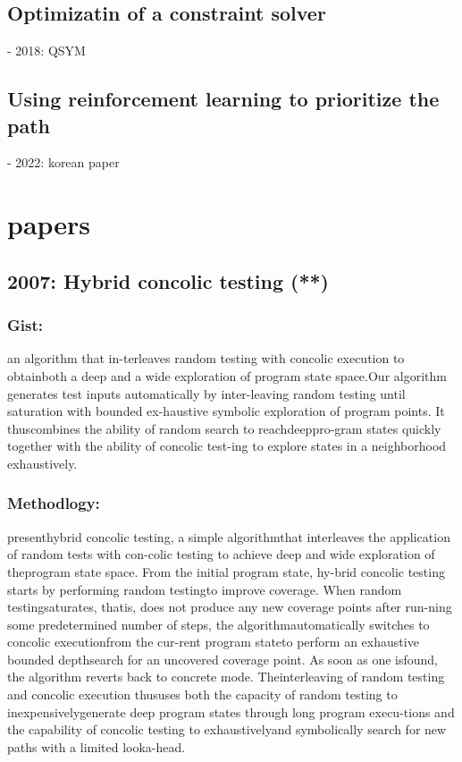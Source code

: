 \documentclass[	runningheads,
				a4paper]{llncs}
\begin{document}
\subsection{Optimizatin of a constraint solver}
- 2018: QSYM

\subsection{Using reinforcement learning to prioritize the path}
- 2022: korean paper


\section{papers}




\subsection{2007: Hybrid concolic testing (**)}

\subsubsection{Gist:}
an algorithm that in-terleaves random testing with concolic execution to obtainboth a deep and a wide exploration of program state space.Our algorithm generates test inputs automatically by inter-leaving  random  testing  until  saturation  with  bounded  ex-haustive  symbolic  exploration  of  program  points.   It  thuscombines the ability of random search to reachdeeppro-gram states quickly together with the ability of concolic test-ing to explore states in a neighborhood exhaustively. 

\subsubsection{Methodlogy:}
presenthybrid concolic testing, a simple algorithmthat  interleaves  the  application  of  random  tests  with  con-colic  testing  to  achieve  deep  and  wide  exploration  of  theprogram  state  space.   From  the  initial  program  state,  hy-brid  concolic  testing  starts  by  performing  random  testingto improve coverage.  When random testingsaturates, thatis,  does  not  produce  any  new  coverage  points  after  run-ning  some  predetermined  number  of  steps,  the  algorithmautomatically switches to concolic executionfrom the cur-rent program stateto perform an exhaustive bounded depthsearch for an uncovered coverage point.  As soon as one isfound,  the algorithm reverts back to concrete mode.   Theinterleaving of random testing and concolic execution thususes both the capacity of random testing to inexpensivelygenerate deep program states through long program execu-tions and the capability of concolic testing to exhaustivelyand symbolically search for new paths with a limited looka-head.
\end{document}

